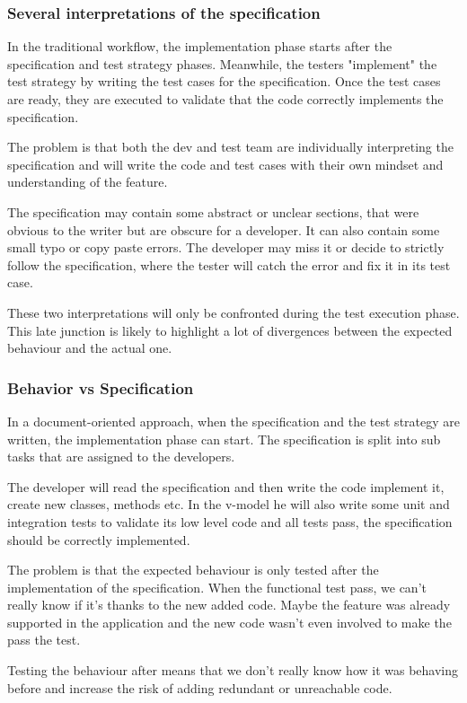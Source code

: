 \subsubsection{Several interpretations of the specification}
In the traditional workflow, the implementation phase starts after the
specification and test strategy phases.
Meanwhile, the testers "implement" the test strategy by writing the
test cases for the specification.
Once the test cases are ready, they are executed to validate that the code
correctly implements the specification.

The problem is that both the dev and test team are individually interpreting
the specification and will write the code and test cases with their own
mindset and understanding of the feature.

The specification may contain some abstract or unclear sections, that were
obvious to the writer but are obscure for a developer.
It can also contain some small typo or copy paste errors.
The developer may miss it or decide to strictly follow the specification,
where the tester will catch the error and fix it in its test case.

These two interpretations will only be confronted during the test
execution phase.
This late junction is likely to highlight a lot of divergences between the
expected behaviour and the actual one.

\subsubsection{Behavior vs Specification}
In a document-oriented approach, when the specification and the test strategy
are written, the implementation phase can start.
The specification is split into sub tasks that are assigned to the developers.

The developer will read the specification and then write the code implement
it, create new classes, methods etc.
In the v-model he will also write some unit and integration tests to validate
its low level code and all tests pass, the specification should be correctly
implemented.

The problem is that the expected behaviour is only tested after the
implementation of the specification.
When the functional test pass, we can't really know if it's thanks to
the new added code.
Maybe the feature was already supported in the application and the new code
wasn't even involved to make the pass the test.

Testing the behaviour after means that we don't really know how it was behaving
before and increase the risk of adding redundant or unreachable code.

